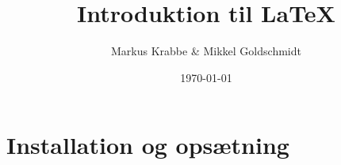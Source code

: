 \documentclass[titlepage]{article}
\title{Introduktion til \LaTeX{} }
\author{Markus Krabbe \& Mikkel Goldschmidt}
\date{\today}
\begin{document}
\maketitle

\tableofcontents
\clearpage

\section{Installation og opsætning}
\end{document}
